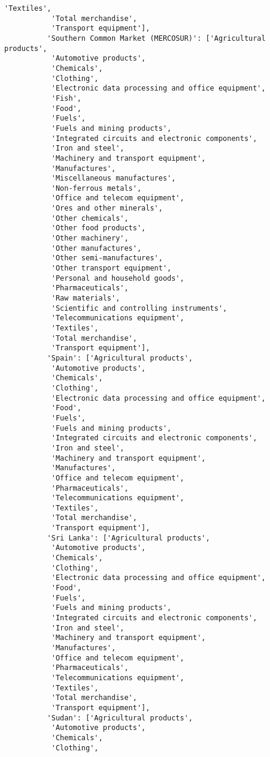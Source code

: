 \documentclass[11pt]{article}
\begin{document}
\begin{Verbatim}[commandchars=\\\{\}]
           'Textiles',
           'Total merchandise',
           'Transport equipment'],
          'Southern Common Market (MERCOSUR)': ['Agricultural products',
           'Automotive products',
           'Chemicals',
           'Clothing',
           'Electronic data processing and office equipment',
           'Fish',
           'Food',
           'Fuels',
           'Fuels and mining products',
           'Integrated circuits and electronic components',
           'Iron and steel',
           'Machinery and transport equipment',
           'Manufactures',
           'Miscellaneous manufactures',
           'Non-ferrous metals',
           'Office and telecom equipment',
           'Ores and other minerals',
           'Other chemicals',
           'Other food products',
           'Other machinery',
           'Other manufactures',
           'Other semi-manufactures',
           'Other transport equipment',
           'Personal and household goods',
           'Pharmaceuticals',
           'Raw materials',
           'Scientific and controlling instruments',
           'Telecommunications equipment',
           'Textiles',
           'Total merchandise',
           'Transport equipment'],
          'Spain': ['Agricultural products',
           'Automotive products',
           'Chemicals',
           'Clothing',
           'Electronic data processing and office equipment',
           'Food',
           'Fuels',
           'Fuels and mining products',
           'Integrated circuits and electronic components',
           'Iron and steel',
           'Machinery and transport equipment',
           'Manufactures',
           'Office and telecom equipment',
           'Pharmaceuticals',
           'Telecommunications equipment',
           'Textiles',
           'Total merchandise',
           'Transport equipment'],
          'Sri Lanka': ['Agricultural products',
           'Automotive products',
           'Chemicals',
           'Clothing',
           'Electronic data processing and office equipment',
           'Food',
           'Fuels',
           'Fuels and mining products',
           'Integrated circuits and electronic components',
           'Iron and steel',
           'Machinery and transport equipment',
           'Manufactures',
           'Office and telecom equipment',
           'Pharmaceuticals',
           'Telecommunications equipment',
           'Textiles',
           'Total merchandise',
           'Transport equipment'],
          'Sudan': ['Agricultural products',
           'Automotive products',
           'Chemicals',
           'Clothing',

\end{Verbatim}
\end{document}
